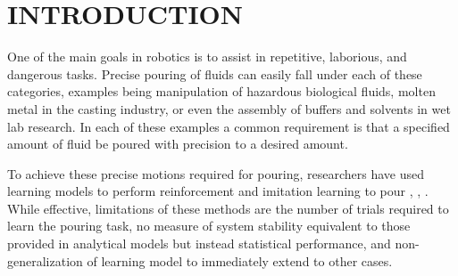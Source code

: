 \section{INTRODUCTION}
\begin{comment}
Outline
1. Give context for need of autonomous pouring 
- Goal of robotics is to assist in repetitive, laborious, and dangerous tasks, pouring can be all of these
-In context of wet lab research, it is desired to pour precise amounts of fluids (buffers, solvents) 
-Pouring in metal work casting using liquid metal.
2. Present previous approaches
-Learning Based methods [disadvantage is number of tries required]
-Sloshing Suppression using Hybrid shape approach [consists of proportional control gain, notch filter and low-pass filter to suppress sloshing]
-Model representation approaches that use feed-forward with hybrid shape approach to minimize sloshing, with feedback only in [noda 2007] which used a lookup table. 
-Vision: detect the water in the first container [Fox], detect the flow in transit [Atkeson: CMU]

3. Contrast areas needing further work (my extension), Emphasize new contribution
-We detect the fluid in the container being poured into, (for applications where a precise amount is needed, the final position of the water should be observed)
-We present an analytical model for pouring then present hybrid control method to perform closed form control for precise pours

4. Outline rest of paper
-Present the general pouring analytical model 
\end{comment}


One of the main goals in robotics is to assist in repetitive, laborious, and dangerous tasks. Precise pouring of fluids can easily fall under each of these categories, examples being manipulation of hazardous biological fluids, molten metal in the casting industry, or even the assembly of buffers and solvents in wet lab research. In each of these examples a common requirement is that a specified amount of fluid be poured with precision to a desired amount. 

To achieve these precise motions required for pouring, researchers have used learning models to perform reinforcement and imitation learning to pour \cite{tamosiunaite2011learning}, \cite{kunze2013acquiring}, \cite{rozo2013force}. While effective, limitations of these methods are the number of trials required to learn the pouring task, no measure of system stability equivalent to those provided in analytical models but instead statistical performance, and non-generalization of learning model to immediately extend to other cases.  

